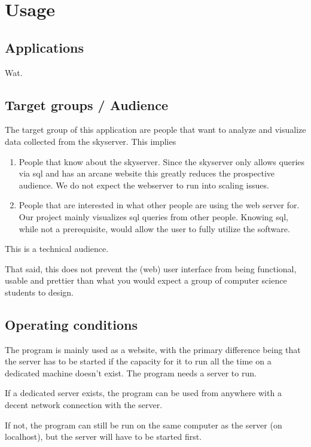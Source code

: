 \section{Usage}

\subsection{Applications}
Wat.

\subsection{Target groups / Audience}

The target group of this application are people that want to analyze 
and visualize data collected from the skyserver. This implies

\begin{enumerate}
   \item People that know about the skyserver. Since the skyserver only 
   allows queries via sql and has an arcane website this greatly 
   reduces the prospective audience. We do not expect the webserver 
   to run into scaling issues.
  
  \item People that are interested in what other people are 
  using the web server for. Our project mainly visualizes sql queries
   from other people. Knowing sql, while not a prerequisite, 
   would allow the user to fully utilize the software.
  
\end{enumerate}

This is a technical audience.

That said, this does not prevent the (web) user interface from being functional,
 usable and prettier than what you would expect a group of 
 computer science students to design.
 

\subsection{Operating conditions}

The program is mainly used as a website, with the primary difference being
 that the server has to be started if the capacity for it to run 
 all the time on a dedicated machine doesn't exist. 
The program needs a server to run. 

If a dedicated server exists, the program can be used from anywhere
 with a decent network connection with the server.

If not, the program can still be run on the same computer as 
the server (on localhost), but the server will have to be started first.
 

